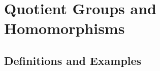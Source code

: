 \documentclass[../main]{subfiles}
\begin{document}
 
 \section{Quotient Groups and Homomorphisms}
 
 \subsection{Definitions and Examples}
 
 \begin{prop}
  
 \end{prop}

 
 
 
 
 
\end{document}
